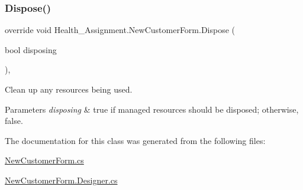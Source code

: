 \subsubsection{\texorpdfstring{Dispose()}{Dispose()}}
{\footnotesize\ttfamily override void Health\+\_\+\+Assignment.\+New\+Customer\+Form.\+Dispose (\begin{DoxyParamCaption}\item[{bool}]{disposing }\end{DoxyParamCaption})\hspace{0.3cm}{\ttfamily [inline]}, {\ttfamily [protected]}}



Clean up any resources being used. 


\begin{DoxyParams}{Parameters}
{\em disposing} & true if managed resources should be disposed; otherwise, false.\\
\hline
\end{DoxyParams}


The documentation for this class was generated from the following files\+:\begin{DoxyCompactItemize}
\item 
\hyperlink{_new_customer_form_8cs}{New\+Customer\+Form.\+cs}\item 
\hyperlink{_new_customer_form_8_designer_8cs}{New\+Customer\+Form.\+Designer.\+cs}\end{DoxyCompactItemize}
